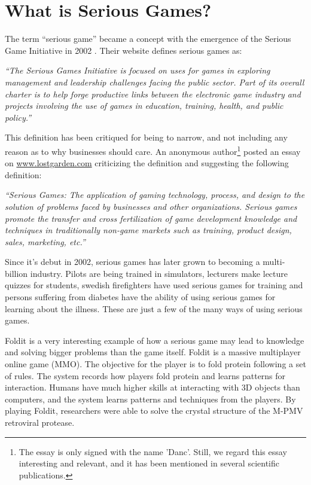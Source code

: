 \section{What is Serious Games?}

The term ``serious game'' became a concept with the emergence of the Serious Game Initiative in 2002 \cite{seriousgamesinitative}. Their website defines serious games as: 

\textit{``The Serious Games Initiative is focused on uses for games in exploring management and leadership challenges facing the public sector. Part of its overall charter is to help forge productive links between the electronic game industry and projects involving the use of games in education, training, health, and public policy.''} 

This definition has been critiqued for being to narrow, and not including any reason as to why businesses should care. An anonymous author\footnote{The essay is only signed with the name 'Danc'. Still, we regard this essay interesting and relevant, and it has been mentioned in several scientific publications.} posted an essay on \url{www.lostgarden.com} criticizing the definition and suggesting the following definition:

\textit{``Serious Games: The application of gaming technology, process, and design to the solution of problems faced by businesses and other organizations. Serious games promote the transfer and cross fertilization of game development knowledge and techniques in traditionally non-game markets such as training, product design, sales, marketing, etc.''}


Since it's debut in 2002, serious games has later grown to becoming a multi-billion industry.
Pilots are being trained in simulators, lecturers make lecture quizzes for students\cite{wang2007lecture}, swedish firefighters have used serious games for training \cite{lebram2009design} and persons suffering from diabetes have the ability of using serious games for learning about the illness. These are just a few of the many ways of using serious games. 

Foldit is a very interesting example of how a serious game may lead to knowledge and solving bigger problems than the game itself\cite{cooper2010predicting}. Foldit is a massive multiplayer online game (MMO). The objective for the player is to fold protein following a set of rules. The system records how players fold protein and learns patterns for interaction. Humans have much higher skills at interacting with 3D objects than computers, and the system learns patterns and techniques from the players. By playing Foldit, researchers were able to solve the crystal structure of the M-PMV retroviral protease\cite{khatib2011crystal}.

